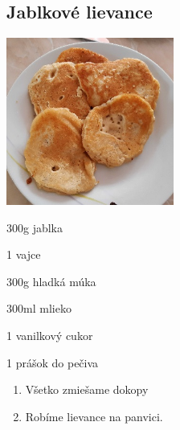 
\setcounter{step}{0}
\subsection{Jablkové lievance}

\begin{ingredient}
\includegraphics[height=5.5cm]{images/lievance}
\def\portions{3}%

\begin{main}
	\item 300g jablka
	\item 1 vajce
	\item 300g hladká múka
	\item 300ml mlieko
	\item 1 vanilkový cukor
	\item 1 prášok do pečiva
\end{main}
\end{ingredient}
\begin{recipe}

\begin{enumerate}

\item{Všetko zmiešame dokopy}
\item{Robíme lievance na panvici.}

\end{enumerate}
\end{recipe}

\begin{notes}

\end{notes}
\clearpage	
